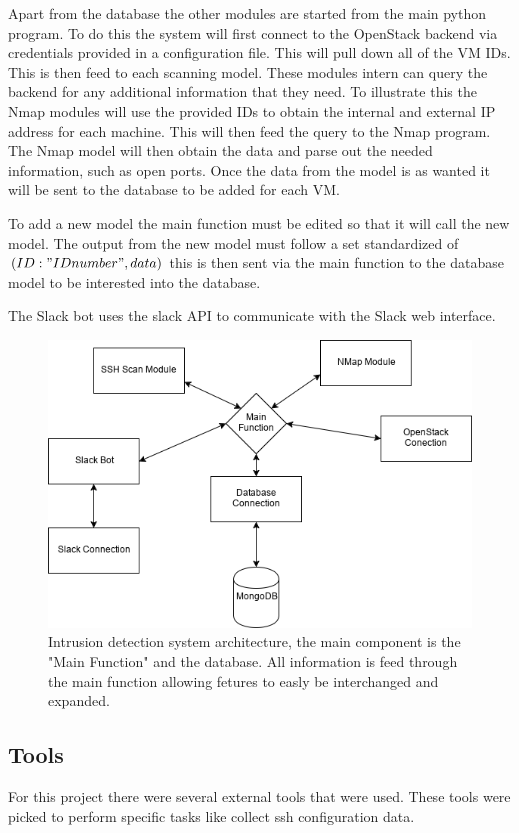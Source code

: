 \documentclass[12pt]{article}
\begin{document}
Apart from the database the other modules are started from the main python program. To do this the system will first connect to the OpenStack backend via credentials provided in a configuration file. This will pull down all of the VM IDs. This is then feed to each scanning model. These modules intern can query the backend for any additional information that they need. To illustrate this the Nmap modules will use the provided IDs to obtain the internal and external IP address for each machine. This will then feed the query to the Nmap program. The Nmap model will then obtain the data and parse out the needed information, such as open ports. Once the data from the model is as wanted it will be sent to the database to be added for each VM.

To add a new model the main function must be edited so that it will call the new model. The output from the new model must follow a set standardized of $(ID: "ID number", data)$ this is then sent via the main function to the database model to be interested into the database.

The Slack bot uses the slack API to communicate with the Slack web interface.

\begin{figure}[ht]
    \includegraphics[scale=.5]{./pic/Arcitecture.png}
    \caption{Intrusion detection system architecture, the main component is the "Main Function" and the database. All information is feed through the main function allowing fetures to easly be interchanged and expanded.}
\end{figure}

\newpage

\subsection{Tools}
For this project there were several external tools that were used. These tools were picked to perform specific tasks like collect ssh configuration data.
\end{document}
